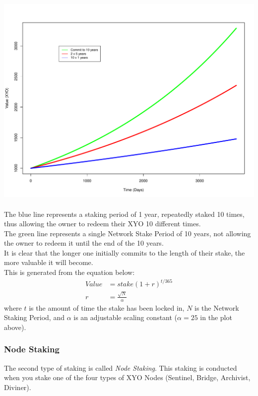\documentclass{article}
\begin{document}
\includegraphics[width=\textwidth]{StakingAlgorithm.pdf}\\\\

The blue line represents a staking period of 1 year, repeatedly staked 10 times, thus allowing the owner to redeem their XYO 10 different times.\\

The green line represents a single Network Stake Period of 10 years, not allowing the owner to redeem it until the end of the 10 years.\\

It is clear that the longer one initially commits to the length of their stake, the more valuable it will become.\\

This is generated from the equation below:
\begin{align}
    Value &= stake(1+r)^{t/365}\\
    r &= \frac{\sqrt{N}}{\alpha}
\end{align}
where $t$ is the amount of time the stake has been locked in, $N$ is the Network Staking Period, and $\alpha$ is an adjustable scaling constant ($\alpha = 25$ in the plot above).




\subsubsection{Node Staking}

The second type of staking is called \textit{Node Staking}. This staking is conducted when you stake one of the four types of XYO Nodes (Sentinel, Bridge, Archivist, Diviner).\\ 
\end{document}
